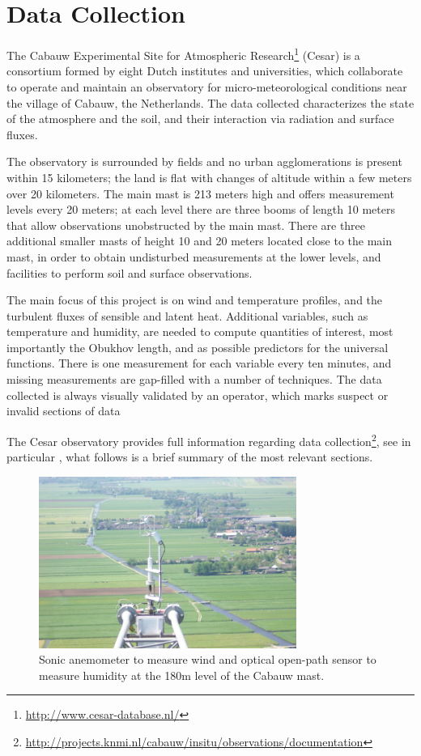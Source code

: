\documentclass[12pt]{book}
\begin{document}
\section{Data Collection}
\label{sec:data_collection}
The Cabauw Experimental Site for Atmospheric Research\footnote{\url{http://www.cesar-database.nl/}} (Cesar) is a consortium formed by eight Dutch institutes and universities, which collaborate to operate and maintain an observatory for micro-meteorological conditions near the village of Cabauw, the Netherlands. The data collected characterizes the state of the atmosphere and the soil, and their interaction via radiation and surface fluxes.

The observatory is surrounded by fields and no urban agglomerations is present within 15 kilometers; the land is flat with changes of altitude within a few meters over 20 kilometers. The main mast is 213 meters high and offers measurement levels every 20 meters; at each level there are three booms of length 10 meters that allow observations unobstructed by the main mast. There are three additional smaller masts of height 10 and 20 meters located close to the main mast, in order to obtain undisturbed measurements at the lower levels, and facilities to perform soil and surface observations.

The main focus of this project is on wind and temperature profiles, and the turbulent fluxes of sensible and latent heat. Additional variables, such as temperature and humidity, are needed to compute quantities of interest, most importantly the Obukhov length, and as possible predictors for the universal functions. There is one measurement for each variable every ten minutes, and missing measurements are gap-filled with a number of techniques. The data collected is always visually validated by an operator, which marks suspect or invalid sections of data

The Cesar observatory provides full information regarding data collection\footnote{\url{http://projects.knmi.nl/cabauw/insitu/observations/documentation}}, see in particular \cite{cabauwinsitu}, what follows is a brief summary of the most relevant sections.

\begin{figure}
\caption{Sonic anemometer to measure wind and optical open-path sensor to measure humidity at the 180m level of the Cabauw mast.}
\label{fig:cabauw_180m_instruments}
\centering
\includegraphics[width=0.75\textwidth]{images/cabauw_turbulence_instruments}
\end{figure}
\end{document}
